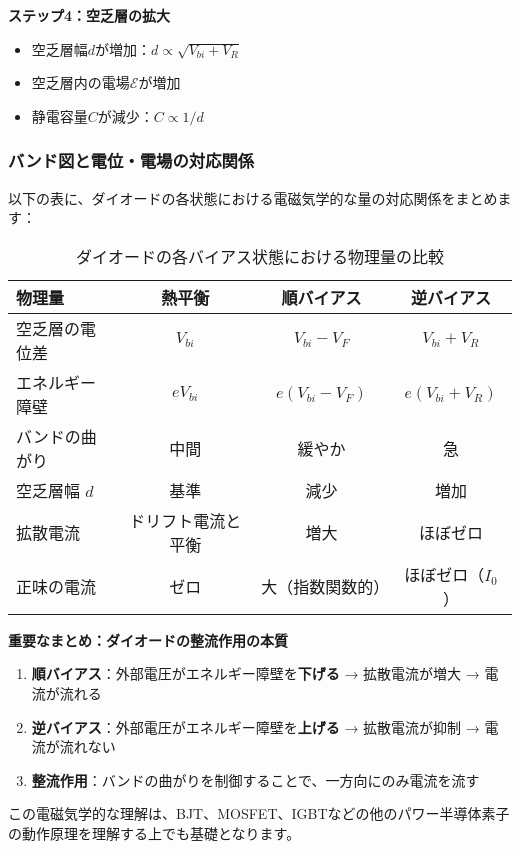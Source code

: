 \textbf{ステップ4：空乏層の拡大}

\begin{itemize}
\item 空乏層幅$d$が増加：$d \propto \sqrt{V_{bi} + V_R}$
\item 空乏層内の電場$\mathcal{E}$が増加
\item 静電容量$C$が減少：$C \propto 1/d$
\end{itemize}

\subsubsection{バンド図と電位・電場の対応関係}

以下の表に、ダイオードの各状態における電磁気学的な量の対応関係をまとめます：

\begin{table}[H]
\centering
\caption{ダイオードの各バイアス状態における物理量の比較}
\begin{tabular}{|l|c|c|c|}
\hline
\textbf{物理量} & \textbf{熱平衡} & \textbf{順バイアス} & \textbf{逆バイアス} \\
\hline
空乏層の電位差 & $V_{bi}$ & $V_{bi} - V_F$ & $V_{bi} + V_R$ \\
\hline
エネルギー障壁 & $eV_{bi}$ & $e(V_{bi} - V_F)$ & $e(V_{bi} + V_R)$ \\
\hline
バンドの曲がり & 中間 & 緩やか & 急 \\
\hline
空乏層幅 $d$ & 基準 & 減少 & 増加 \\
\hline
拡散電流 & ドリフト電流と平衡 & 増大 & ほぼゼロ \\
\hline
正味の電流 & ゼロ & 大（指数関数的） & ほぼゼロ（$I_0$） \\
\hline
\end{tabular}
\end{table}

\textbf{重要なまとめ：ダイオードの整流作用の本質}

\begin{enumerate}
\item \textbf{順バイアス}：外部電圧がエネルギー障壁を\textbf{下げる} → 拡散電流が増大 → 電流が流れる
\item \textbf{逆バイアス}：外部電圧がエネルギー障壁を\textbf{上げる} → 拡散電流が抑制 → 電流が流れない
\item \textbf{整流作用}：バンドの曲がりを制御することで、一方向にのみ電流を流す
\end{enumerate}

この電磁気学的な理解は、BJT、MOSFET、IGBTなどの他のパワー半導体素子の動作原理を理解する上でも基礎となります。

